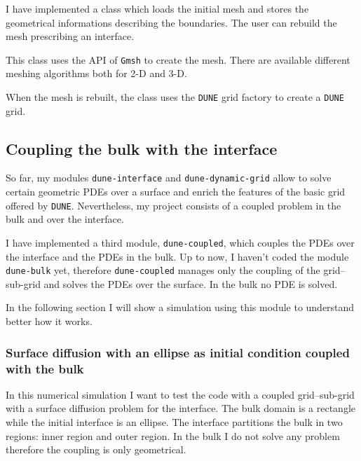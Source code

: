 \documentclass[a4paper,11pt, onecolumn]{article}
\begin{document}
\noindent I have implemented a class which loads the initial mesh and stores the geometrical informations describing the boundaries. The user can rebuild the mesh prescribing an interface. 

\noindent This class uses the API of \verb|Gmsh| \cite{GeuzaineR09} to create the mesh. There are available different meshing algorithms both for 2-D and 3-D.

\noindent When the mesh is rebuilt, the class uses the \verb|DUNE| grid factory to create a \verb|DUNE| grid.

\subsection{Coupling the bulk with the interface}

So far, my modules \verb|dune-interface| and \verb|dune-dynamic-grid| allow to solve certain geometric PDEs over a surface and enrich the features of the basic grid offered by \verb|DUNE|. Nevertheless, my project consists of a coupled problem in the bulk and over the interface.
\newline

\noindent I have implemented a third module, \verb|dune-coupled|, which couples the PDEs over the interface and the PDEs in the bulk. Up to now, I haven't coded the module \verb|dune-bulk| yet, therefore \verb|dune-coupled| manages only the coupling of the grid--sub-grid and solves the PDEs over the surface. In the bulk no PDE is solved.
\newline

\noindent In the following section I will show a simulation using this module to understand better how it works.

\subsubsection{Surface diffusion with an ellipse as initial condition coupled with the bulk}

In this numerical simulation I want to test the code with a coupled grid--sub-grid  with a surface diffusion problem for the interface. The bulk domain is a rectangle while the initial interface is an ellipse. The interface partitions the bulk in two regions: inner region and outer region. In the bulk I do not solve any problem therefore the coupling is only geometrical.
\newline
\end{document}

